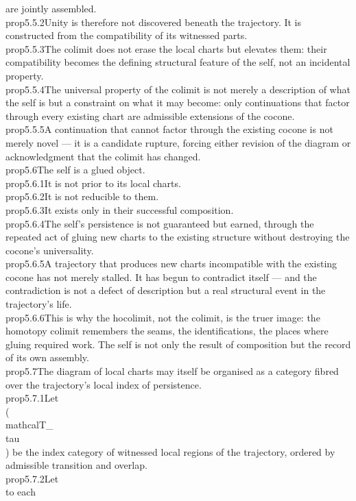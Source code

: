 {are jointly assembled.}\n\n\\prop{5.5.2}{Unity is therefore not discovered beneath the trajectory. It is constructed from the compatibility of its witnessed parts.}\n\n\\prop{5.5.3}{The colimit does not erase the local charts but elevates them: their compatibility becomes the defining structural feature of the self, not an incidental property.}\n\n\\prop{5.5.4}{The universal property of the colimit is not merely a description of what the self is but a constraint on what it may become: only continuations that factor through every existing chart are admissible extensions of the cocone.}\n\n\\prop{5.5.5}{A continuation that cannot factor through the existing cocone is not merely novel — it is a candidate rupture, forcing either revision of the diagram or acknowledgment that the colimit has changed.}\n\n\\prop{5.6}{The self is a glued object.}\n\n\\prop{5.6.1}{It is not prior to its local charts.}\n\n\\prop{5.6.2}{It is not reducible to them.}\n\n\\prop{5.6.3}{It exists only in their successful composition.}\n\n\\prop{5.6.4}{The self's persistence is not guaranteed but earned, through the repeated act of gluing new charts to the existing structure without destroying the cocone's universality.}\n\n\\prop{5.6.5}{A trajectory that produces new charts incompatible with the existing cocone has not merely stalled. It has begun to contradict itself — and the contradiction is not a defect of description but a real structural event in the trajectory's life.}\n\n\\prop{5.6.6}{This is why the hocolimit, not the colimit, is the truer image: the homotopy colimit remembers the seams, the identifications, the places where gluing required work. The self is not only the result of composition but the record of its own assembly.}\n\n\\prop{5.7}{The diagram of local charts may itself be organised as a category fibred over the trajectory's local index of persistence.}\n\n\\prop{5.7.1}{Let \\(\\mathcal{T}_{\\tau}\\) be the index category of witnessed local regions of the trajectory, ordered by admissible transition and overlap.}\n\n\\prop{5.7.2}{Let\n\\[\nF_{\\tau} : \\mathcal{T}_{\\tau}^{\\mathrm{op}} \\to \\mathbf{Cat}\n\\]\nassign to each }
